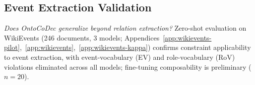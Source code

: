 
\subsection{Event Extraction Validation}
\label{sec:wikievents}

\emph{Does OntoCoDec generalize beyond relation extraction?}
Zero-shot evaluation on WikiEvents (246 documents, 3 models; Appendices~\ref{app:wikievents-pilot},~\ref{app:wikievents},~\ref{app:wikievents-kappa}) confirms constraint applicability to event extraction, with event-vocabulary (EV) and role-vocabulary (RoV) violations eliminated across all models; fine-tuning composability is preliminary ($n{=}20$).
